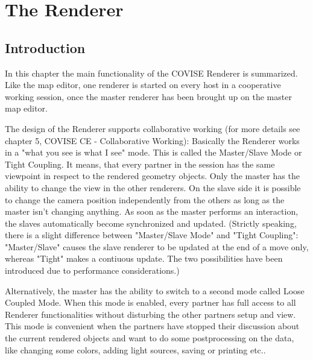 \begin{htmlonly}




\end{htmlonly}




\startdocument
\chapter{The Renderer}
\label{Renderer}

\section{Introduction}

In this chapter the main functionality of the COVISE Renderer is summarized.
Like the map editor, one renderer is started on every host in a cooperative
working session, once the master renderer has been brought up on the master map editor. 

The design of the Renderer supports collaborative working (for more details see chapter 5,
COVISE CE - Collaborative Working): Basically the Renderer works in a 
"what you see is what I see" mode. This is called
the Master/Slave Mode or Tight Coupling. It means, that every partner in the session
has the same viewpoint in respect to the rendered geometry objects. Only the 
master has the ability to change the view in the other renderers. On the slave
side it is possible to change the camera position independently from the others
as long as the master isn't changing anything. As soon as the master performs an
interaction, the slaves automatically become synchronized and updated.
(Strictly speaking, there is a
slight difference between "Master/Slave Mode" and "Tight Coupling": "Master/Slave" causes the slave
renderer to be updated at the end of a move only, whereas "Tight" makes a contiuous update. The two
possibilities have been introduced due to performance considerations.) 

Alternatively, the master has the ability to switch to a second mode called Loose
Coupled Mode. When this mode is enabled, every partner has full access to all
Renderer functionalities without disturbing the other partners setup and view.
This mode is convenient when the partners have stopped their discussion about the
current rendered objects and want to do some postprocessing on the data, like
changing some colors, adding light sources, saving or printing etc.. 

